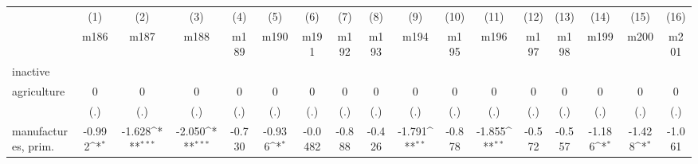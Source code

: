 {
\def\sym#1{\ifmmode^{#1}\else\(^{#1}\)\fi}
\begin{tabular}{l*{16}{c}}
\hline\hline
                    &\multicolumn{1}{c}{(1)}&\multicolumn{1}{c}{(2)}&\multicolumn{1}{c}{(3)}&\multicolumn{1}{c}{(4)}&\multicolumn{1}{c}{(5)}&\multicolumn{1}{c}{(6)}&\multicolumn{1}{c}{(7)}&\multicolumn{1}{c}{(8)}&\multicolumn{1}{c}{(9)}&\multicolumn{1}{c}{(10)}&\multicolumn{1}{c}{(11)}&\multicolumn{1}{c}{(12)}&\multicolumn{1}{c}{(13)}&\multicolumn{1}{c}{(14)}&\multicolumn{1}{c}{(15)}&\multicolumn{1}{c}{(16)}\\
                    &\multicolumn{1}{c}{m186}&\multicolumn{1}{c}{m187}&\multicolumn{1}{c}{m188}&\multicolumn{1}{c}{m189}&\multicolumn{1}{c}{m190}&\multicolumn{1}{c}{m191}&\multicolumn{1}{c}{m192}&\multicolumn{1}{c}{m193}&\multicolumn{1}{c}{m194}&\multicolumn{1}{c}{m195}&\multicolumn{1}{c}{m196}&\multicolumn{1}{c}{m197}&\multicolumn{1}{c}{m198}&\multicolumn{1}{c}{m199}&\multicolumn{1}{c}{m200}&\multicolumn{1}{c}{m201}\\
\hline
inactive            &                     &                     &                     &                     &                     &                     &                     &                     &                     &                     &                     &                     &                     &                     &                     &                     \\
agriculture         &           0         &           0         &           0         &           0         &           0         &           0         &           0         &           0         &           0         &           0         &           0         &           0         &           0         &           0         &           0         &           0         \\
                    &         (.)         &         (.)         &         (.)         &         (.)         &         (.)         &         (.)         &         (.)         &         (.)         &         (.)         &         (.)         &         (.)         &         (.)         &         (.)         &         (.)         &         (.)         &         (.)         \\
[1em]
manufactures, prim. &      -0.992\sym{*}  &      -1.628\sym{***}&      -2.050\sym{***}&      -0.730         &      -0.936\sym{*}  &     -0.0482         &      -0.888         &      -0.426         &      -1.791\sym{**} &      -0.878         &      -1.855\sym{**} &      -0.572         &      -0.557         &      -1.186\sym{*}  &      -1.428\sym{*}  &      -1.061         \\

\end{tabular}}

